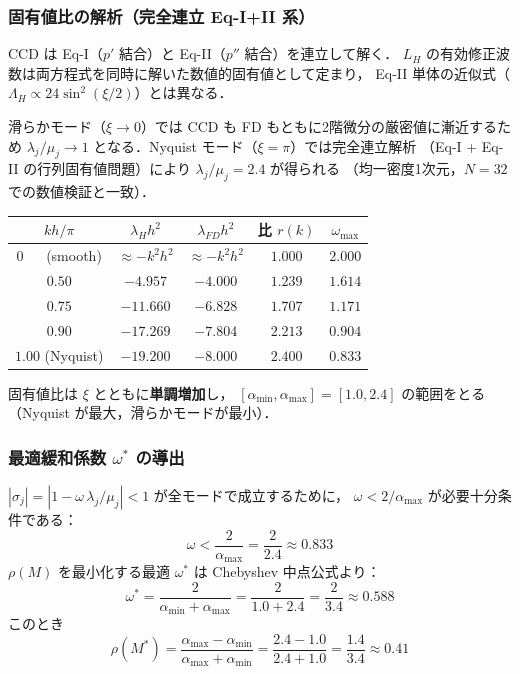 \subsubsection*{固有値比の解析（完全連立 Eq-I+II 系）}

CCD は Eq-I（$p'$ 結合）と Eq-II（$p''$ 結合）を連立して解く．
$L_H$ の有効修正波数は両方程式を同時に解いた数値的固有値として定まり，
Eq-II 単体の近似式（$\Lambda_H \propto 24\sin^2(\xi/2)$）とは異なる．

滑らかモード（$\xi \to 0$）では CCD も FD もともに2階微分の厳密値に漸近するため
$\lambda_j/\mu_j \to 1$ となる．Nyquist モード（$\xi = \pi$）では完全連立解析
（Eq-I + Eq-II の行列固有値問題）により $\lambda_j/\mu_j = 2.4$ が得られる
（均一密度1次元，$N=32$ での数値検証と一致）．

\begin{center}
\PaperTableSetup
\begin{tabular}{ccccc}
\toprule
$kh/\pi$ & $\lambda_H h^2$ & $\lambda_{FD} h^2$ & 比 $r(k)$ & $\omega_{\max}$ \\
\midrule
$0\phantom{.00}$ (smooth) & $\approx -k^2 h^2$ & $\approx -k^2 h^2$ & $1.000$ & $2.000$ \\
$0.50$ & $-4.957$ & $-4.000$ & $1.239$ & $1.614$ \\
$0.75$ & $-11.660$ & $-6.828$ & $1.707$ & $1.171$ \\
$0.90$ & $-17.269$ & $-7.804$ & $2.213$ & $0.904$ \\
$1.00$ (Nyquist) & $-19.200$ & $-8.000$ & $2.400$ & $0.833$ \\
\bottomrule
\end{tabular}
\end{center}

固有値比は $\xi$ とともに\textbf{単調増加}し，
$[\alpha_{\min}, \alpha_{\max}] = [1.0, 2.4]$ の範囲をとる
（Nyquist が最大，滑らかモードが最小）．
\label{eq:dc_eigenvalue_ratio}

\subsubsection*{\texorpdfstring{最適緩和係数 $\omega^*$ の導出}{最適緩和係数 ω* の導出}}

$|\sigma_j| = |1 - \omega\,\lambda_j/\mu_j| < 1$ が全モードで成立するために，
$\omega < 2 / \alpha_{\max}$ が必要十分条件である：
\begin{equation}
  \omega < \frac{2}{\alpha_{\max}} = \frac{2}{2.4} \approx 0.833
  \label{eq:dc_omega_max}
\end{equation}
$\rho(M)$ を最小化する最適 $\omega^*$ は Chebyshev 中点公式より：
\begin{equation}
  \omega^* = \frac{2}{\alpha_{\min} + \alpha_{\max}}
  = \frac{2}{1.0 + 2.4}
  = \frac{2}{3.4}
  \approx 0.588
  \label{eq:dc_omega_opt}
\end{equation}
このとき
\begin{equation}
  \rho(M^*) = \frac{\alpha_{\max} - \alpha_{\min}}{\alpha_{\max} + \alpha_{\min}}
  = \frac{2.4 - 1.0}{2.4 + 1.0}
  = \frac{1.4}{3.4}
  \approx 0.41
  \label{eq:dc_rho_opt}
\end{equation}

